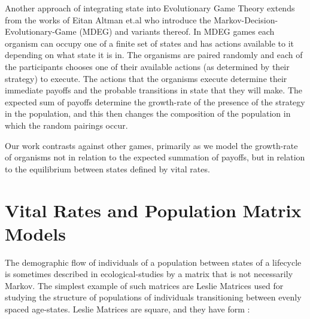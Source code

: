 Another approach of integrating state into Evolutionary Game Theory extends from the works of Eitan Altman et.al \cite{markov2,markov3,markov4,markov5,markov8,markov9} who introduce the Markov-Decision-Evolutionary-Game (MDEG) and variants thereof.
In MDEG games each organism can occupy one of a finite set of states and has actions available to it depending on what state it is in.
The organisms are paired randomly and each of the participants chooses one of their available actions (as determined by their strategy) to execute.
The actions that the organisms execute determine their immediate payoffs and the probable transitions in state that they will make.
The expected sum of payoffs determine the growth-rate of the presence of the strategy in the population, and this then changes the composition of the population in which the random pairings occur.

Our work contrasts against other games, primarily as we model the growth-rate of organisms not in relation to the expected summation of payoffs, but in relation to the equilibrium between states defined by vital rates.


\section{Vital Rates and Population Matrix Models}\label{sec:2}

The demographic flow of individuals of a population between states of a lifecycle is sometimes described in ecological-studies by a matrix that is not necessarily Markov.
The simplest example of such matrices are Leslie Matrices used for studying the structure of populations of individuals transitioning between evenly spaced age-states.
Leslie Matrices are square, and they have form \cite{leslie}:


